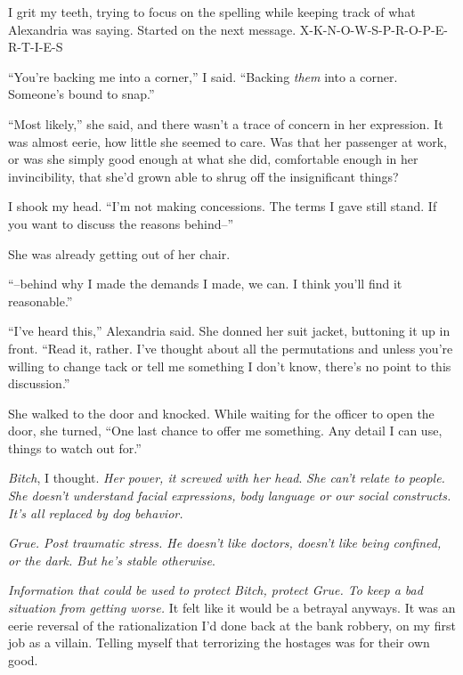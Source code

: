 I grit my teeth, trying to focus on the spelling while keeping track of what Alexandria was saying.  Started on the next message.  X-K-N-O-W-S-P-R-O-P-E-R-T-I-E-S



``You're backing me into a corner,'' I said.  ``Backing \emph{them} into a corner.  Someone's bound to snap.''



``Most likely,'' she said, and there wasn't a trace of concern in her expression.  It was almost eerie, how little she seemed to care.  Was that her passenger at work, or was she simply good enough at what she did, comfortable enough in her invincibility, that she'd grown able to shrug off the insignificant things?



I shook my head.  ``I'm not making concessions.  The terms I gave still stand.  If you want to discuss the reasons behind--''



She was already getting out of her chair.



``--behind why I made the demands I made, we can.  I think you'll find it reasonable.''



``I've heard this,'' Alexandria said.  She donned her suit jacket, buttoning it up in front.  ``Read it, rather.  I've thought about all the permutations and unless you're willing to change tack or tell me something I don't know, there's no point to this discussion.''



She walked to the door and knocked.  While waiting for the officer to open the door, she turned, ``One last chance to offer me something.  Any detail I can use, things to watch out for.''



\emph{Bitch}, I thought.  \emph{Her power, it screwed with her head}.  \emph{She can't relate to people.  She doesn't understand facial expressions, body language or our social constructs.  It's all replaced by dog behavior. }



\emph{Grue.  Post traumatic stress.  He doesn't like doctors, doesn't like being confined, or the dark.  But he's stable otherwise}.



\emph{Information that could be used to protect Bitch, protect Grue.  To keep a bad situation from getting worse.  }It felt like it would be a betrayal anyways.  It was an eerie reversal of the rationalization I'd done back at the bank robbery, on my first job as a villain.  Telling myself that terrorizing the hostages was for their own good.



